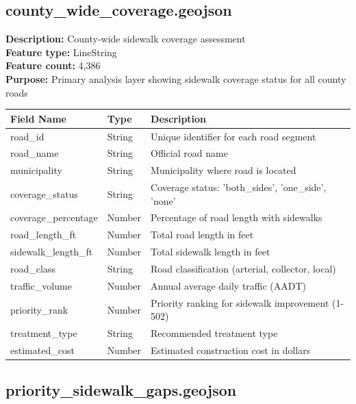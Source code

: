 \documentclass[11pt,letterpaper]{article}
\begin{document}
\subsection{county\_wide\_coverage.geojson}

\textbf{Description:} County-wide sidewalk coverage assessment\\
\textbf{Feature type:} LineString\\
\textbf{Feature count:} 4,386\\
\textbf{Purpose:} Primary analysis layer showing sidewalk coverage status for all county roads

\begin{table}[h]
\centering
\caption{Attribute Dictionary - county\_wide\_coverage.geojson}
\begin{longtable}{lll}
\toprule
\textbf{Field Name} & \textbf{Type} & \textbf{Description} \\
\midrule
road\_id & String & Unique identifier for each road segment \\
road\_name & String & Official road name \\
municipality & String & Municipality where road is located \\
coverage\_status & String & Coverage status: 'both\_sides', 'one\_side', 'none' \\
coverage\_percentage & Number & Percentage of road length with sidewalks \\
road\_length\_ft & Number & Total road length in feet \\
sidewalk\_length\_ft & Number & Total sidewalk length in feet \\
road\_class & String & Road classification (arterial, collector, local) \\
traffic\_volume & Number & Annual average daily traffic (AADT) \\
priority\_rank & Number & Priority ranking for sidewalk improvement (1-502) \\
treatment\_type & String & Recommended treatment type \\
estimated\_cost & Number & Estimated construction cost in dollars \\
\bottomrule
\end{longtable}
\end{table}

\subsection{priority\_sidewalk\_gaps.geojson}
\end{document}
